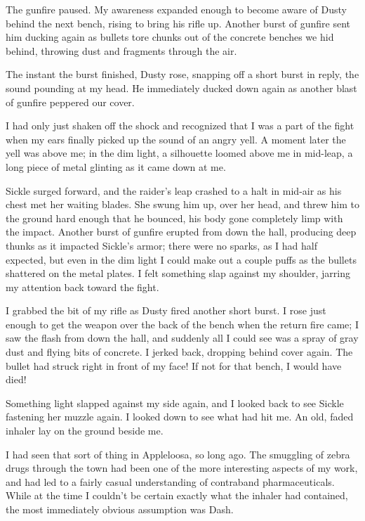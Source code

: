 The gunfire paused. My awareness expanded enough to become aware of Dusty behind the next bench, rising to bring his rifle up. Another burst of gunfire sent him ducking again as bullets tore chunks out of the concrete benches we hid behind, throwing dust and fragments through the air.

The instant the burst finished, Dusty rose, snapping off a short burst in reply, the sound pounding at my head. He immediately ducked down again as another blast of gunfire peppered our cover.

I had only just shaken off the shock and recognized that I was a part of the fight when my ears finally picked up the sound of an angry yell. A moment later the yell was above me; in the dim light, a silhouette loomed above me in mid-leap, a long piece of metal glinting as it came down at me.

Sickle surged forward, and the raider’s leap crashed to a halt in mid-air as his chest met her waiting blades. She swung him up, over her head, and threw him to the ground hard enough that he bounced, his body gone completely limp with the impact. Another burst of gunfire erupted from down the hall, producing deep thunks as it impacted Sickle’s armor; there were no sparks, as I had half expected, but even in the dim light I could make out a couple puffs as the bullets shattered on the metal plates. I felt something slap against my shoulder, jarring my attention back toward the fight.

I grabbed the bit of my rifle as Dusty fired another short burst. I rose just enough to get the weapon over the back of the bench when the return fire came; I saw the flash from down the hall, and suddenly all I could see was a spray of gray dust and flying bits of concrete. I jerked back, dropping behind cover again. The bullet had struck right in front of my face! If not for that bench, I would have died!

Something light slapped against my side again, and I looked back to see Sickle fastening her muzzle again. I looked down to see what had hit me. An old, faded inhaler lay on the ground beside me.

I had seen that sort of thing in Appleloosa, so long ago. The smuggling of zebra drugs through the town had been one of the more interesting aspects of my work, and had led to a fairly casual understanding of contraband pharmaceuticals. While at the time I couldn’t be certain exactly what the inhaler had contained, the most immediately obvious assumption was Dash.

